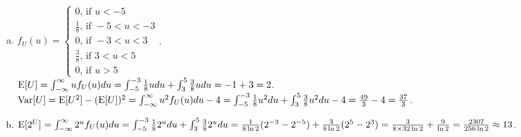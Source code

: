 \begin{pr}$ $
\begin{enumerate}[(a)]
\item $f_U(u)=\begin{cases}
0\text{, if }u<-5\\
\frac18\text{, if }-5<u<-3\\
0\text{, if }-3<u<3\\
\frac38\text{, if }3<u<5\\
0\text{, if }u>5
\end{cases}$.\\
$\mathrm{E}[U]=\int_{-\infty}^\infty uf_U(u)du=\int_{-5}^{-3}\frac18udu+\int_3^5\frac38udu=-1+3=2$.\\
$\mathrm{Var}[U]=\mathrm{E}[U^2]-(\mathrm{E}[U])^2=\int_{-\infty}^\infty u^2f_U(u)du-4=\int_{-5}^{-3}\frac18u^2du+\int_3^5\frac38u^2du-4=\frac{49}3-4=\frac{37}3$.
\item $\mathrm{E}[2^U]=\int_{-\infty}^\infty2^uf_U(u)du=\int_{-5}^{-3}\frac182^udu+\int_3^5\frac382^udu=\frac1{8\ln 2}(2^{-3}-2^{-5})+\frac3{8\ln 2}(2^5-2^3)=\frac3{8\times32\ln 2}+\frac9{\ln 2}=\frac{2307}{256\ln 2}\approx13$.
\end{enumerate}
\end{pr}
